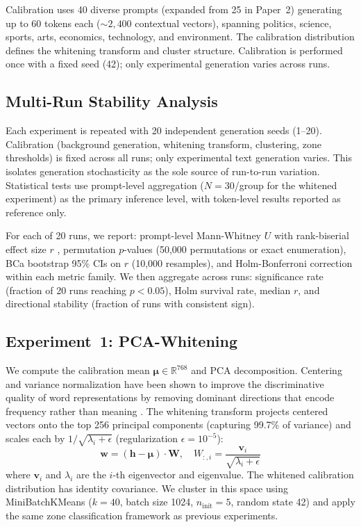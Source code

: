 \documentclass[11pt]{article}
\newcommand{\hvec}{\mathbf{h}}
\newcommand{\wvec}{\mathbf{w}}
\begin{document}
Calibration uses 40 diverse prompts (expanded from 25 in Paper~2) generating up to 60 tokens each (${\sim}2{,}400$ contextual vectors), spanning politics, science, sports, arts, economics, technology, and environment. The calibration distribution defines the whitening transform and cluster structure. Calibration is performed once with a fixed seed (42); only experimental generation varies across runs.

\subsection{Multi-Run Stability Analysis}

Each experiment is repeated with 20 independent generation seeds (1--20). Calibration (background generation, whitening transform, clustering, zone thresholds) is fixed across all runs; only experimental text generation varies. This isolates generation stochasticity as the sole source of run-to-run variation. Statistical tests use prompt-level aggregation ($N = 30$/group for the whitened experiment) as the primary inference level, with token-level results reported as reference only.

For each of 20 runs, we report: prompt-level Mann-Whitney $U$ with rank-biserial effect size $r$ \citep{vargha2000critique}, permutation $p$-values (50,000 permutations or exact enumeration), BCa bootstrap 95\% CIs on $r$ (10,000 resamples), and Holm-Bonferroni correction \citep{holm1979simple} within each metric family. We then aggregate across runs: significance rate (fraction of 20 runs reaching $p < 0.05$), Holm survival rate, median $r$, and directional stability (fraction of runs with consistent sign).

\subsection{Experiment~1: PCA-Whitening}

We compute the calibration mean $\boldsymbol{\mu} \in \mathbb{R}^{768}$ and PCA decomposition. Centering and variance normalization have been shown to improve the discriminative quality of word representations by removing dominant directions that encode frequency rather than meaning \citep{mu2018allbut}. The whitening transform projects centered vectors onto the top 256 principal components (capturing 99.7\% of variance) and scales each by $1/\sqrt{\lambda_i + \epsilon}$ (regularization $\epsilon = 10^{-5}$):
%
\begin{equation}
\wvec = (\hvec - \boldsymbol{\mu}) \cdot \mathbf{W}, \quad W_{:,i} = \frac{\mathbf{v}_i}{\sqrt{\lambda_i + \epsilon}}
\end{equation}
%
where $\mathbf{v}_i$ and $\lambda_i$ are the $i$-th eigenvector and eigenvalue. The whitened calibration distribution has identity covariance. We cluster in this space using MiniBatchKMeans \citep{sculley2010web} ($k = 40$, batch size 1024, $n_{\text{init}} = 5$, random state 42) and apply the same zone classification framework as previous experiments.
\end{document}
